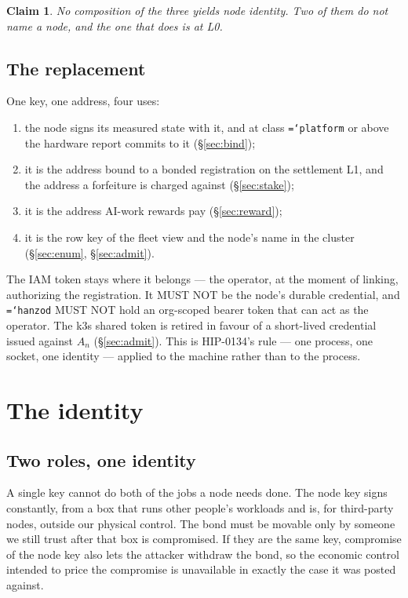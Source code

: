 \documentclass[11pt,a4paper]{article}
\newtheorem{claim}[definition]{Claim}
\newcommand{\code}[1]{\texttt{\hyphenchar\font=`\-\relax #1}}
\begin{document}
\begin{claim}
No composition of the three yields node identity. Two of them do not name a node,
and the one that does is at L0.
\end{claim}

\subsection{The replacement}

One key, one address, four uses:

\begin{enumerate}[label=(\alph*)]
\item the node signs its measured state with it, and at class \code{platform} or
  above the hardware report commits to it (\S\ref{sec:bind});
\item it is the address bound to a bonded registration on the settlement L1, and
  the address a forfeiture is charged against (\S\ref{sec:stake});
\item it is the address AI-work rewards pay (\S\ref{sec:reward});
\item it is the row key of the fleet view and the node's name in the cluster
  (\S\ref{sec:enum}, \S\ref{sec:admit}).
\end{enumerate}

The IAM token stays where it belongs --- the operator, at the moment of linking,
authorizing the registration. It MUST NOT be the node's durable credential, and
\code{hanzod} MUST NOT hold an org-scoped bearer token that can act as the
operator. The k3s shared token is retired in favour of a short-lived credential
issued against $A_n$ (\S\ref{sec:admit}). This is HIP-0134's rule --- one process,
one socket, one identity --- applied to the machine rather than to the process.

\section{The identity}
\label{sec:identity}

\subsection{Two roles, one identity}
\label{sec:roles}

A single key cannot do both of the jobs a node needs done. The node key signs
constantly, from a box that runs other people's workloads and is, for third-party
nodes, outside our physical control. The bond must be movable only by someone we
still trust after that box is compromised. If they are the same key, compromise
of the node key also lets the attacker withdraw the bond, so the economic control
intended to price the compromise is unavailable in exactly the case it was posted
against.
\end{document}
